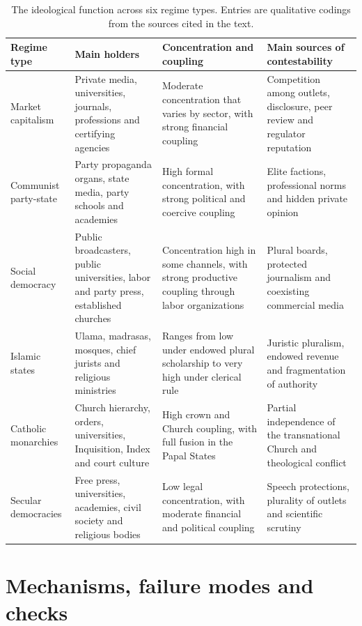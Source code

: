 \documentclass[11pt,letterpaper]{article}
\theoremstyle{definition}
\theoremstyle{remark}
\begin{document}
\begin{table}[t]
\centering
\small
\caption{The ideological function across six regime types. Entries are qualitative codings from the sources cited in the text.}
\label{tab:regimes}
\begin{tabularx}{\textwidth}{@{}L{2.3cm}YYY@{}}
\toprule
Regime type & Main holders & Concentration and coupling & Main sources of contestability \\
\midrule
Market capitalism & Private media, universities, journals, professions and certifying agencies & Moderate concentration that varies by sector, with strong financial coupling & Competition among outlets, disclosure, peer review and regulator reputation \\
Communist party-state & Party propaganda organs, state media, party schools and academies & High formal concentration, with strong political and coercive coupling & Elite factions, professional norms and hidden private opinion \\
Social democracy & Public broadcasters, public universities, labor and party press, established churches & Concentration high in some channels, with strong productive coupling through labor organizations & Plural boards, protected journalism and coexisting commercial media \\
Islamic states & Ulama, madrasas, mosques, chief jurists and religious ministries & Ranges from low under endowed plural scholarship to very high under clerical rule & Juristic pluralism, endowed revenue and fragmentation of authority \\
Catholic monarchies & Church hierarchy, orders, universities, Inquisition, Index and court culture & High crown and Church coupling, with full fusion in the Papal States & Partial independence of the transnational Church and theological conflict \\
Secular democracies & Free press, universities, academies, civil society and religious bodies & Low legal concentration, with moderate financial and political coupling & Speech protections, plurality of outlets and scientific scrutiny \\
\bottomrule
\end{tabularx}
\end{table}

\section{Mechanisms, failure modes and checks}
\label{sec:mechanisms}
\end{document}
